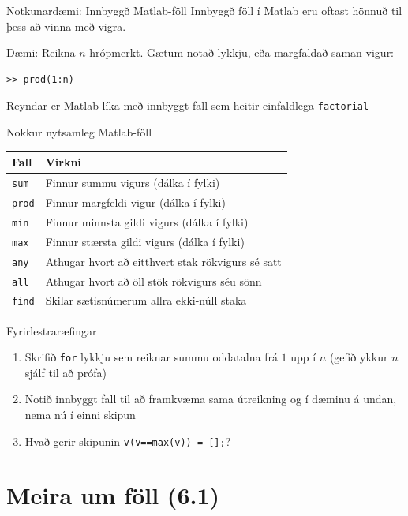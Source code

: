 \documentclass{beamer}
\begin{document}
\begin{frame}[fragile]{Notkunardæmi: Innbyggð Matlab-föll}
Innbyggð föll í Matlab eru oftast hönnuð til þess að vinna með vigra.

Dæmi: Reikna $n$ hrópmerkt. Gætum notað lykkju, eða margfaldað saman vigur:
\begin{verbatim}
>> prod(1:n)
\end{verbatim}
\pause Reyndar er Matlab líka með innbyggt fall sem heitir einfaldlega \texttt{factorial}
\end{frame}
\begin{frame}{Nokkur nytsamleg Matlab-föll}
\begin{center}
\begin{tabular}{ll}
\toprule
Fall			&Virkni\\
\midrule
\texttt{sum}		&Finnur summu vigurs (dálka í fylki)\\
\texttt{prod}		&Finnur margfeldi vigur (dálka í fylki)\\
\texttt{min}		&Finnur minnsta gildi vigurs (dálka í fylki)\\
\texttt{max}		&Finnur stærsta gildi vigurs (dálka í fylki)\\
\texttt{any}		&Athugar hvort að eitthvert stak rökvigurs sé satt\\
\texttt{all}		&Athugar hvort að öll stök rökvigurs séu sönn\\
\texttt{find}		&Skilar sætisnúmerum allra ekki-núll staka\\
\bottomrule
\end{tabular}
\end{center}
\end{frame}

\begin{frame}{Fyrirlestraræfingar}

\begin{enumerate}
 \item Skrifið \texttt{for} lykkju sem reiknar summu oddatalna frá $1$ upp í $n$ (gefið ykkur $n$ sjálf til að prófa)
 \item Notið innbyggt fall til að framkvæma sama útreikning og í dæminu á undan, nema nú í einni skipun
 \item Hvað gerir skipunin \texttt{v(v==max(v)) = [];}?
\end{enumerate}


\end{frame}


\section{Meira um föll (6.1)}
\end{document}
